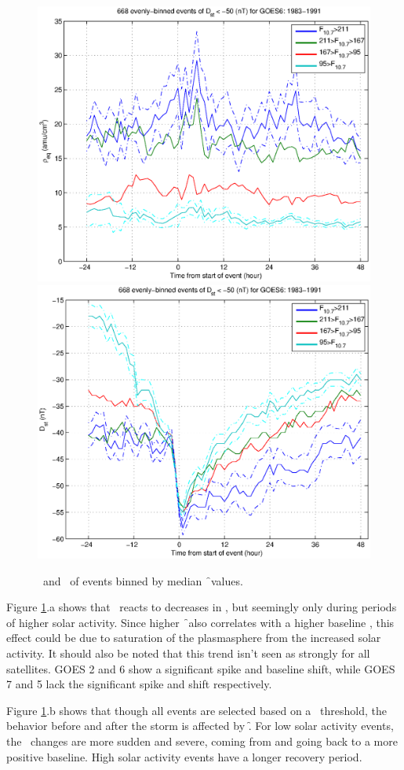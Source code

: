 \begin{figure}[htp!]
	\centering
	\includegraphics[width=0.7\linewidth]{Figures/HighLowF107rhoeq-Dst50-GOES6-1983-1991}
	\includegraphics[width=0.7\linewidth]{Figures/HighLowF107Dst-Dst50-GOES6-1983-1991}	
	\caption{\req\ and \dst\ of events binned by median \f\ values. }
	\label{fig:HighLowF107rhoeq}
\end{figure}

Figure \ref{fig:HighLowF107rhoeq}.a shows that \req\ reacts to decreases in \dst, but seemingly only during periods of higher solar activity. Since higher \f\ also correlates with a higher baseline \req, this effect could be due to saturation of the plasmasphere from the increased solar activity. It should also be noted that this trend isn't seen as strongly for all satellites. GOES 2 and 6 show a significant spike and baseline shift, while GOES 7 and 5 lack the significant spike and shift respectively. 

Figure \ref{fig:HighLowF107rhoeq}.b shows that though all events are selected based on a \dst\ threshold, the behavior before and after the storm is affected by \f. For low solar activity events, the \dst\ changes are more sudden and severe, coming from and going back to a more positive baseline. High solar activity events have a longer recovery period.



